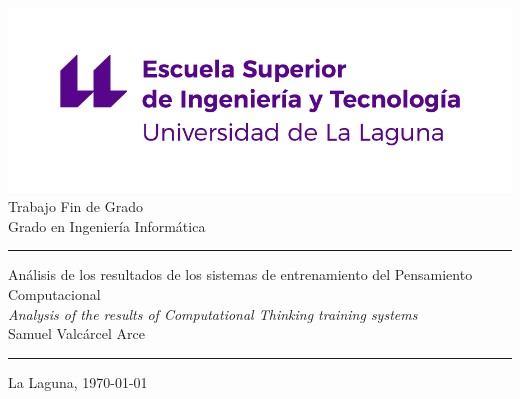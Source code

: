 \documentclass[spanish,a4paper,14pt,oneside]{extreport}
\begin{document}
   
   
  \pagestyle{empty}
  \thispagestyle{empty}
   
   
  \newcommand{\HRule}{\rule{\linewidth}{1mm}}
  \setlength{\parindent}{0mm}
  \setlength{\parskip}{2.5mm}
   
   
  \begin{center}
  \includegraphics[scale=0.8]{images/logo_nuevo}\\[10mm]
  {\Huge Trabajo Fin de Grado}\\
  \bigskip
  {\LARGE Grado en Ingeniería Informática}\\
  \end{center}
   
  \HRule
  \begin{flushright}
         {\Huge Análisis de los resultados de los sistemas de entrenamiento del Pensamiento Computacional} \\[2.5mm]
         {\Large \textit{Analysis of the results of Computational Thinking training systems}} \\[5mm]
         {\Large Samuel Valcárcel Arce} \\[5mm]
  \end{flushright}
  \HRule
  \begin{center}
   \Large La Laguna, \today
  \end{center}
   
  \setlength{\parindent}{5mm}
   
  \newpage
  \thispagestyle{empty}
   
\end{document}
